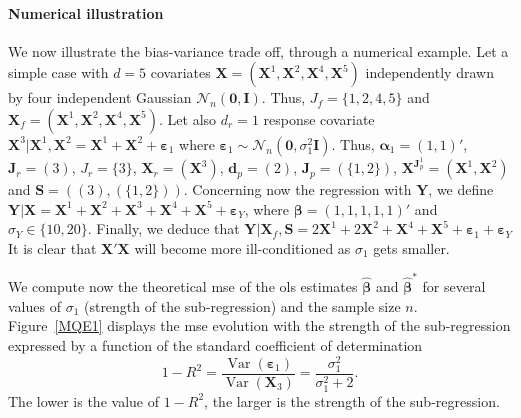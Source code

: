 \documentclass[11pt,a4paper]{article}
\begin{document}

\paragraph{Numerical illustration} We now illustrate the bias-variance trade off, through a numerical example. Let a simple case with $d=5$ covariates $\boldsymbol{X}=(\boldsymbol{X}^1,\boldsymbol{X}^2, \boldsymbol{X}^4, \boldsymbol{X}^5)$ independently drawn by four independent Gaussian $\mathcal{N}_n(\boldsymbol{0},\boldsymbol{I})$. Thus, $J_f=\{1,2,4,5\}$ and $\boldsymbol{X}_f=(\boldsymbol{X}^1,\boldsymbol{X}^2,\boldsymbol{X}^4,\boldsymbol{X}^5)$. Let also $d_r=1$ response covariate $\boldsymbol{X}^3|\boldsymbol{X}^1,\boldsymbol{X}^2=\boldsymbol{X}^1+\boldsymbol{X}^2+\boldsymbol{\varepsilon}_1$ where $\boldsymbol{\varepsilon}_1\sim{\mathcal{N}_n(\boldsymbol{0},\sigma_1^2\boldsymbol{I})}$. Thus, $\boldsymbol{\alpha}_1=(1,1)'$, $\boldsymbol{J}_r=(3)$, $J_r=\{3\}$, $\boldsymbol{X}_r=(\boldsymbol{X}^3)$, $\boldsymbol{d}_p=(2)$, $\boldsymbol{J}_p=(\{1,2\})$, $\boldsymbol{X}^{\boldsymbol{J}_p^1}=(\boldsymbol{X}^1,\boldsymbol{X}^2)$ and $\boldsymbol{S}=((3),(\{1,2\}))$. Concerning now the regression with $\boldsymbol{Y}$, we define $\boldsymbol{Y}|\boldsymbol{X}=\boldsymbol{X}^1+\boldsymbol{X}^2+\boldsymbol{X}^3+\boldsymbol{X}^4+\boldsymbol{X}^5+\boldsymbol{\varepsilon}_Y$, where $\boldsymbol{\beta}=(1,1,1,1,1)'$ and $\sigma_Y \in \{10,20\}$. Finally, we deduce that $\boldsymbol{Y}|\boldsymbol{X}_f,\boldsymbol{S}=2\boldsymbol{X}^1+2\boldsymbol{X}^2+\boldsymbol{X}^4+\boldsymbol{X}^5+\boldsymbol{\varepsilon}_1+\boldsymbol{\varepsilon}_Y$
It is clear that $\boldsymbol{X}'\boldsymbol{X}$ will become more ill-conditioned as $\sigma_1$ gets smaller.
	
We compute now the theoretical {\sc mse} of the {\sc ols} estimates $\hat{\boldsymbol{\beta}}$ and $\hat{\boldsymbol{\beta}}^*$ for several values of $\sigma_1$ (strength of the sub-regression) and the sample size $n$. Figure~\ref{MQE1} displays the {\sc mse} evolution with the strength of the sub-regression expressed by a function of the standard coefficient of determination
	\begin{equation}
		1-R^2=\frac{\operatorname{Var}(\boldsymbol{\varepsilon}_1)}{\operatorname{Var}(\boldsymbol{X}_3)}=\frac{\sigma_1^2}{\sigma_1^2+2}.
	\end{equation}
The lower is the value of $1-R^2$, the larger is the strength of the sub-regression.
	
\end{document}
